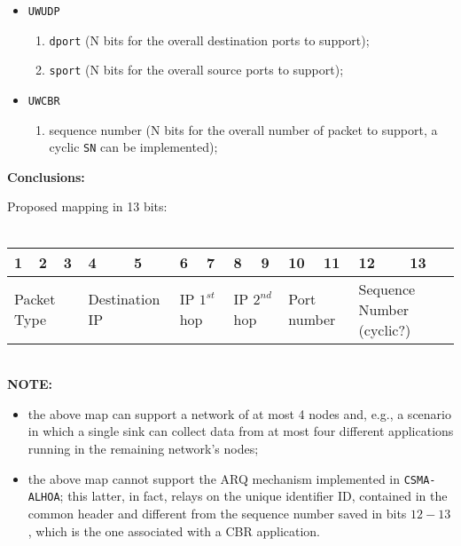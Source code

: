 \documentclass[11pt,journal,draftclsnofoot,onecolumn,twoside,letterpaper]{IEEEtran}
\theoremstyle{definition} \newtheorem{definition}[]{Definition}
\theoremstyle{theorem} \newtheorem{theorem}[]{Theorem}
\begin{document}
\begin{itemize}
\begin{enumerate}
 \end{enumerate}
 \item {\tt UWUDP}
 \begin{enumerate}
  \item {\tt dport} (N bits for the overall destination ports to support);
  \item {\tt sport} (N bits for the overall source ports to support);
 \end{enumerate}
 \item {\tt UWCBR}
  \begin{enumerate}
  \item sequence number (N bits for the overall number of packet to support, a cyclic {\tt SN} can be implemented);
 \end{enumerate}
\end{itemize}

{\bf Conclusions:}

Proposed mapping in 13 bits:\\
\ \\
\begin{tabular}{|p{}|p{}|p{}|p{}|p{}|p{}|p{}|p{}|p{}|p{}|p{}|p{}|p{}|}
\hline
 1& 2& 3& 4& 5& 6& 7& 8& 9& 10& 11& 12& 13\\
\hline
\multicolumn{3}{|p{0.15\columnwidth}|}{Packet Type}& \multicolumn{2}{|p{0.14\columnwidth}|}{Destination IP} & \multicolumn{2}{|p{0.1\columnwidth}|}{IP $1^{st}$ hop} & \multicolumn{2}{|p{0.1\columnwidth}|}{IP $2^{nd}$ hop}& \multicolumn{2}{|p{0.12\columnwidth}|}{Port number} & \multicolumn{2}{|p{0.1\columnwidth}|}{Sequence Number (cyclic?)}\\
\hline
\end{tabular}
\ \\
{\bf NOTE:} 
\begin{itemize}
 \item the above map can support a network of at most 4 nodes and, e.g., a scenario in which a single sink can collect data from at most four different applications running in the remaining network's nodes;
 \item the above map cannot support the ARQ mechanism implemented in {\tt CSMA-ALHOA}; this latter, in fact, relays on the unique identifier ID, contained in the common header and different from the sequence number saved in bits $12-13$, which is the one associated with a CBR application. 
\end{itemize}
\end{document}
